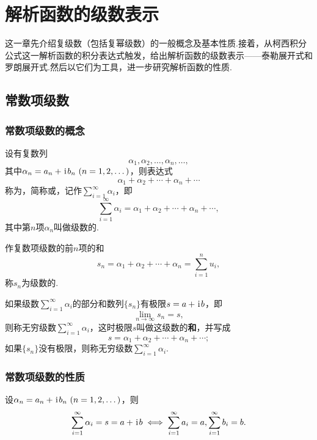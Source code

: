 \chapter{解析函数的级数表示}
这一章先介绍复级数（包括复幂级数）的一般概念及基本性质.接着，从柯西积分公式这一解析函数的积分表达式触发，给出解析函数的级数表示——泰勒展开式和罗朗展开式.然后以它们为工具，进一步研究解析函数的性质.

\section{常数项级数}
\subsection{常数项级数的概念}
\begin{definition}
设有复数列\[
\alpha_1,\alpha_2,\dotsc,\alpha_n,\dotsc,
\]其中\(\alpha_n=a_n+\iu b_n\ (n=1,2,\dotsc)\)，则表达式\[
\alpha_1+\alpha_2+\dotsb+\alpha_n+\dotsb
\]称为，简称或，记作\(\sum\limits_{i=1}^{\infty}\alpha_i\)，即\[
\sum\limits_{i=1}^{\infty}\alpha_i = \alpha_1+\alpha_2+\dotsb+\alpha_n+\dotsb,
\]其中第\(n\)项\(\alpha_n\)叫做级数的.

作复数项级数的前\(n\)项的和\[
s_n = \alpha_1+\alpha_2+\dotsb+\alpha_n = \sum\limits_{i=1}^n{u_i},
\]称\(s_n\)为级数的.

如果级数\(\sum\limits_{i=1}^{\infty}\alpha_i\)的部分和数列\(\{s_n\}\)有极限\(s=a+\kern1pt\mathrm{i}\kern1pt b\)，即\[
\lim\limits_{n\to\infty}s_n = s,
\]则称无穷级数\(\sum\limits_{i=1}^{\infty}\alpha_i\)，这时极限\(s\)叫做这级数的\textbf{和}，并写成\[
s = \alpha_1+\alpha_2+\dotsb+\alpha_n+\dotsb;
\]如果\(\{s_n\}\)没有极限，则称无穷级数\(\sum\limits_{i=1}^{\infty}\alpha_i\).
\end{definition}

\subsection{常数项级数的性质}
\begin{theorem}\label{theorem:解析函数的级数表示.复级数与其实部及虚部级数的关系}
设\(\alpha_n=a_n+\iu b_n\ (n=1,2,\dots)\)，则\[
\sum\limits_{i=1}^{\infty} \alpha_i = s = a + \kern1pt\mathrm{i}\kern1pt b
\iff
\sum\limits_{i=1}^{\infty} a_i = a,
\sum\limits_{i=1}^{\infty} b_i = b.
\]
\end{theorem}

